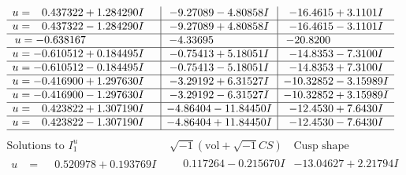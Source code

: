 \documentclass[1p]{elsarticle_modified}
\theoremstyle{definition}
\newcommand{\I}{\sqrt{-1}}
\begin{document}
$$\begin{array}{c|c|c}
\begin{aligned}
u &= \phantom{-}0.437322 + 1.284290 I\end{aligned}
 & -9.27089 - 4.80858 I & -16.4615 + 3.1101 I \\ \hline\begin{aligned}
u &= \phantom{-}0.437322 - 1.284290 I\end{aligned}
 & -9.27089 + 4.80858 I & -16.4615 - 3.1101 I \\ \hline\begin{aligned}
u &= -0.638167\phantom{ +0.000000I}\end{aligned}
 & -4.33695\phantom{ +0.000000I} & -20.8200\phantom{ +0.000000I} \\ \hline\begin{aligned}
u &= -0.610512 + 0.184495 I\end{aligned}
 & -0.75413 + 5.18051 I & -14.8353 - 7.3100 I \\ \hline\begin{aligned}
u &= -0.610512 - 0.184495 I\end{aligned}
 & -0.75413 - 5.18051 I & -14.8353 + 7.3100 I \\ \hline\begin{aligned}
u &= -0.416900 + 1.297630 I\end{aligned}
 & -3.29192 + 6.31527 I & -10.32852 - 3.15989 I \\ \hline\begin{aligned}
u &= -0.416900 - 1.297630 I\end{aligned}
 & -3.29192 - 6.31527 I & -10.32852 + 3.15989 I \\ \hline\begin{aligned}
u &= \phantom{-}0.423822 + 1.307190 I\end{aligned}
 & -4.86404 - 11.84450 I & -12.4530 + 7.6430 I \\ \hline\begin{aligned}
u &= \phantom{-}0.423822 - 1.307190 I\end{aligned}
 & -4.86404 + 11.84450 I & -12.4530 - 7.6430 I\\
 \hline 
 \end{array}$$\newpage$$\begin{array}{c|c|c}  
\text{Solutions to }I^u_{1}& \I (\text{vol} + \sqrt{-1}CS) & \text{Cusp shape}\\
 \hline 
\begin{aligned}
u &= \phantom{-}0.520978 + 0.193769 I\end{aligned}
 & \phantom{-}0.117264 - 0.215670 I & -13.04627 + 2.21794 I \\ \hline\begin{aligned}

\end{aligned}
\end{array}$$
\end{document}
